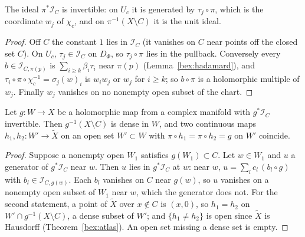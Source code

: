 \begin{lemma}
\label{bex:proj-invertible}
\leanok
The ideal \(\pi^*\mathcal I_C\) is invertible: on \(U_c\) it is generated by \(\tau_j\circ\pi\), which is the coordinate \(w_j\) of \(\chi_c\), and on
\(\pi^{-1}(X\setminus C)\) it is the unit ideal.
\end{lemma}
\begin{proof}
\leanok
Off \(C\) the constant \(1\) lies in \(\mathcal I_C\) (it vanishes on \(C\) near points off the closed set \(C\)). On \(U_c\),
\(\tau_j\in\mathcal I_C\) on \(D_\Phi\), so \(\tau_j\circ\pi\) lies in the pullback. Conversely every \(b\in\mathcal I_{C,\pi(p)}\) is
\(\sum_{i\ge k}\beta_i\tau_i\) near \(\pi(p)\) (Lemma~\ref{bex:hadamard}), and \(\tau_i\circ\pi\circ\chi_c^{-1}=\sigma_j(w)_i\) is \(w_iw_j\) or \(w_j\) for
\(i\ge k\); so \(b\circ\pi\) is a holomorphic multiple of \(w_j\). Finally \(w_j\) vanishes on no nonempty open subset of the chart.
\end{proof}

\begin{lemma}
\label{bex:lift-unique}
\leanok
Let \(g\colon W\to X\) be a holomorphic map from a complex manifold with \(g^*\mathcal I_C\) invertible. Then \(g^{-1}(X\setminus C)\) is dense
in \(W\), and two continuous maps \(h_1,h_2\colon W'\to\tilde X\) on an open set \(W'\subset W\) with \(\pi\circ h_1=\pi\circ h_2=g\) on \(W'\)
coincide.
\end{lemma}
\begin{proof}
\leanok
Suppose a nonempty open \(W_1\) satisfies \(g(W_1)\subset C\). Let \(w\in W_1\) and \(u\) a generator of \(g^*\mathcal I_C\) near \(w\). Then \(u\) lies
in \(g^*\mathcal I_C\) at \(w\): near \(w\), \(u=\sum_lc_l\,(b_l\circ g)\) with \(b_l\in\mathcal I_{C,g(w)}\). Each \(b_l\) vanishes on \(C\) near
\(g(w)\), so \(u\) vanishes on a nonempty open subset of \(W_1\) near \(w\), which the generator does not. For the second statement, a point of
\(\tilde X\) over \(x\notin C\) is \((x,0)\), so \(h_1=h_2\) on \(W'\cap g^{-1}(X\setminus C)\), a dense subset of \(W'\); and
\(\{h_1\ne h_2\}\) is open since \(\tilde X\) is Hausdorff (Theorem~\ref{bex:atlas}). An open set missing a dense set is empty.
\end{proof}

